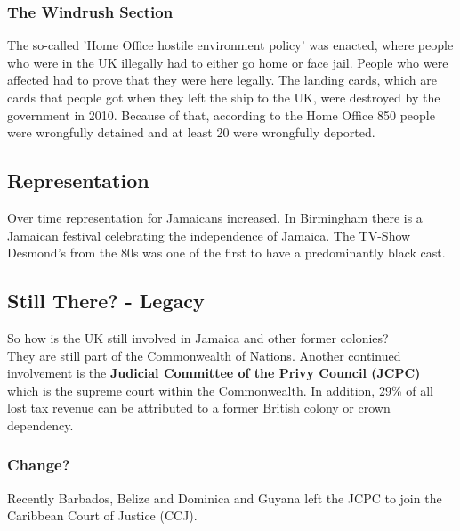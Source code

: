 \documentclass{article}
\begin{document}
	\subsubsection{The Windrush Section}
	The so-called 'Home Office hostile environment policy' was enacted, where people who were in the UK illegally had to either go home or face jail. People who were affected had to prove that they were here legally. The landing cards, which are cards that people got when they left the ship to the UK, were destroyed by the government in 2010. Because of that, according to the Home Office 850 people were wrongfully detained and at least 20 were wrongfully deported. \\
	\subsection{Representation}
	Over time representation for Jamaicans increased. In Birmingham there is a Jamaican festival celebrating the independence of Jamaica. The TV-Show Desmond's from the 80s was one of the first to have a predominantly black cast. \\
	\subsection{Still There? - Legacy}
	So how is the UK still involved in Jamaica and other former colonies? \\
	They are still part of the Commonwealth of Nations. Another continued involvement is the \textbf{Judicial Committee of the Privy Council (JCPC)} which is the supreme court within the Commonwealth. In addition, 29\% of all lost tax revenue can be attributed to a former British colony or crown dependency. \\
	\subsubsection{Change?}
	Recently Barbados, Belize and Dominica and Guyana left the JCPC to join the Caribbean Court of Justice (CCJ).
	 


	
	
	
























	
\end{document}

